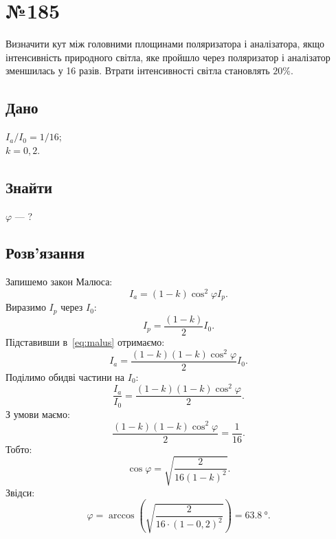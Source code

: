 \documentclass[a4paper,oneside,DIV=10,12pt]{scrartcl}
\begin{document}
	\section*{№185}
		Визначити кут між головними площинами поляризатора і аналізатора, якщо інтенсивність природного світла, яке пройшло через поляризатор і аналізатор зменшилась у 16 разів. Втрати інтенсивності світла становлять $20\%$.
		
		\subsection*{Дано}
		\noindent${I_a} / {I_0} = {1} / {16}$; \\
		$k = 0{,}2$.
			
		\subsection*{Знайти}
			$\varphi$ — ?
			
		\subsection*{Розв'язання}
			Запишемо закон Малюса:
			\begin{equation}
			\label{eq:malus}
				I_a = (1 - k) \cos^2 \varphi I_p.
			\end{equation}
			Виразимо $I_p$ через $I_0$:
			\[
				I_p = \frac{(1 - k)}{2} I_0.
			\]
			Підставивши в~\eqref{eq:malus} отримаємо:
			\[
				I_a = \frac{(1 - k) (1 - k) \cos^2 \varphi}{2} I_0.
			\]
			Поділимо обидві частини на $I_0$:
			\[
				\frac{I_a}{I_0} = \frac{(1 - k) (1 - k) \cos^2 \varphi}{2}.
			\]
			З умови маємо:
			\[
				\frac{(1 - k) (1 - k) \cos^2 \varphi}{2} = \frac{1}{16}.
			\]
			Тобто:
			\[
				\cos \varphi = \sqrt{
					\frac{2}{16 (1 - k)^2}
				}.
			\]
			Звідси:
			\[
				\varphi = \arccos \left(
					\sqrt{
						\frac{2}{16 \cdot (1 - 0{,}2)^2}
					}
				\right)
				= \SI{63,8}{\degree}.
			\]
\end{document}
